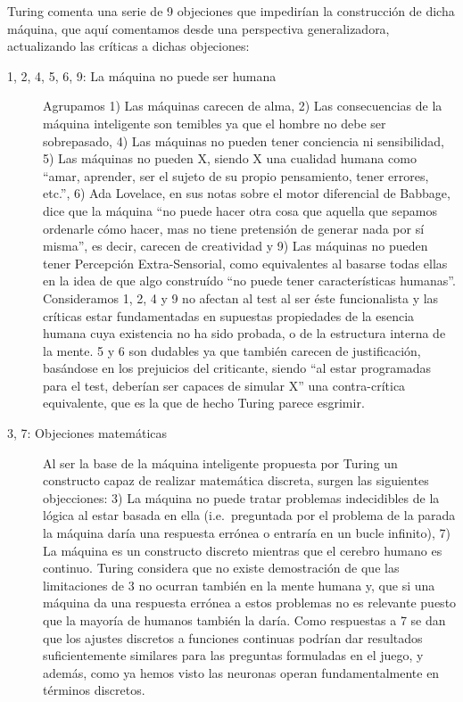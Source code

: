 \documentclass[12pt]{memoir}
\begin{document}
Turing comenta una serie de 9 objeciones que impedirían la construcción de dicha máquina, que aquí comentamos desde una perspectiva generalizadora, actualizando las críticas a dichas objeciones:

\begin{description}
	\item[1, 2, 4, 5, 6, 9: La máquina no puede ser humana] Agrupamos 1) Las máquinas carecen de alma, 2) Las consecuencias de la máquina inteligente son temibles ya que el hombre no debe ser sobrepasado, 4) Las máquinas no pueden tener conciencia ni sensibilidad, 5) Las máquinas no pueden X, siendo X una cualidad humana como ``amar, aprender, ser el sujeto de su propio pensamiento, tener errores, etc.'', 6) Ada Lovelace, en sus notas sobre el motor diferencial de Babbage, dice que la máquina ``no puede hacer otra cosa que aquella que sepamos ordenarle cómo hacer, mas no tiene pretensión de generar nada por sí misma'', es decir, carecen de creatividad y 9) Las máquinas no pueden tener Percepción Extra-Sensorial, como equivalentes al basarse todas ellas en la idea de que algo construído ``no puede tener características humanas''. Consideramos 1, 2, 4 y 9 no afectan al test al ser éste funcionalista y las críticas estar fundamentadas en supuestas propiedades de la esencia humana cuya existencia no ha sido probada, o de la estructura interna de la mente. 5 y 6 son dudables ya que también carecen de justificación, basándose en los prejuicios del criticante, siendo ``al estar programadas para el test, deberían ser capaces de simular X'' una contra-crítica equivalente, que es la que de hecho Turing parece esgrimir.
	\item[3, 7: Objeciones matemáticas] Al ser la base de la máquina inteligente propuesta por Turing un constructo capaz de realizar matemática discreta, surgen las siguientes objecciones: 3) La máquina no puede tratar problemas indecidibles de la lógica al estar basada en ella (i.e.\ preguntada por el problema de la parada la máquina daría una respuesta errónea o entraría en un bucle infinito), 7) La máquina es un constructo discreto mientras que el cerebro humano es continuo. Turing considera que no existe demostración de que las limitaciones de 3 no ocurran también en la mente humana y, que si una máquina da una respuesta errónea a estos problemas no es relevante puesto que la mayoría de humanos también la daría. Como respuestas a 7 se dan que los ajustes discretos a funciones continuas podrían dar resultados suficientemente similares para las preguntas formuladas en el juego, y además, como ya hemos visto las neuronas operan fundamentalmente en términos discretos.

\end{description}
\end{document}
